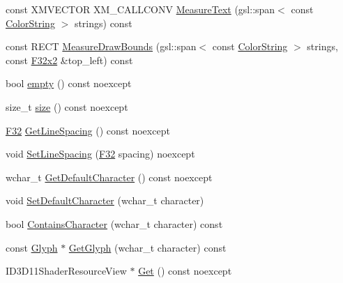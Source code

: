 \begin{DoxyCompactItemize}
\item 
const X\+M\+V\+E\+C\+T\+OR X\+M\+\_\+\+C\+A\+L\+L\+C\+O\+NV \mbox{\hyperlink{classmage_1_1rendering_1_1_sprite_font_a56471bbeedfa1982f05bf1b9055f74f1}{Measure\+Text}} (gsl\+::span$<$ const \mbox{\hyperlink{classmage_1_1rendering_1_1_color_string}{Color\+String}} $>$ strings) const
\item 
const R\+E\+CT \mbox{\hyperlink{classmage_1_1rendering_1_1_sprite_font_a661820d3d7b20a797966007cd712a76b}{Measure\+Draw\+Bounds}} (gsl\+::span$<$ const \mbox{\hyperlink{classmage_1_1rendering_1_1_color_string}{Color\+String}} $>$ strings, const \mbox{\hyperlink{namespacemage_a9dc0d34d6ecc87e4cfa4a826102117bc}{F32x2}} \&top\+\_\+left) const
\item 
bool \mbox{\hyperlink{classmage_1_1rendering_1_1_sprite_font_acc6d1e6ea5d1cb5ca55154a3f4cdc70e}{empty}} () const noexcept
\item 
size\+\_\+t \mbox{\hyperlink{classmage_1_1rendering_1_1_sprite_font_a4f5191f82d228c41b5b6b1ca8215a4b2}{size}} () const noexcept
\item 
\mbox{\hyperlink{namespacemage_aa97e833b45f06d60a0a9c4fc22ae02c0}{F32}} \mbox{\hyperlink{classmage_1_1rendering_1_1_sprite_font_af8a9229b449007440733cdd65d65b2f5}{Get\+Line\+Spacing}} () const noexcept
\item 
void \mbox{\hyperlink{classmage_1_1rendering_1_1_sprite_font_a0dc7afe54ffa5f2215efc739ba8dc2ed}{Set\+Line\+Spacing}} (\mbox{\hyperlink{namespacemage_aa97e833b45f06d60a0a9c4fc22ae02c0}{F32}} spacing) noexcept
\item 
wchar\+\_\+t \mbox{\hyperlink{classmage_1_1rendering_1_1_sprite_font_af50e0ef59bf9d4be7b402c71609de497}{Get\+Default\+Character}} () const noexcept
\item 
void \mbox{\hyperlink{classmage_1_1rendering_1_1_sprite_font_a7400d0574c96e4e204268d6cd5a5c356}{Set\+Default\+Character}} (wchar\+\_\+t character)
\item 
bool \mbox{\hyperlink{classmage_1_1rendering_1_1_sprite_font_a6f9adb6806acc990ac3feaa547f7f296}{Contains\+Character}} (wchar\+\_\+t character) const
\item 
const \mbox{\hyperlink{structmage_1_1rendering_1_1_glyph}{Glyph}} $\ast$ \mbox{\hyperlink{classmage_1_1rendering_1_1_sprite_font_aa56b305252b14f6ecf51738fccb16e93}{Get\+Glyph}} (wchar\+\_\+t character) const
\item 
I\+D3\+D11\+Shader\+Resource\+View $\ast$ \mbox{\hyperlink{classmage_1_1rendering_1_1_sprite_font_ab24067a24942427a39d88ca042da3484}{Get}} () const noexcept
\end{DoxyCompactItemize}

